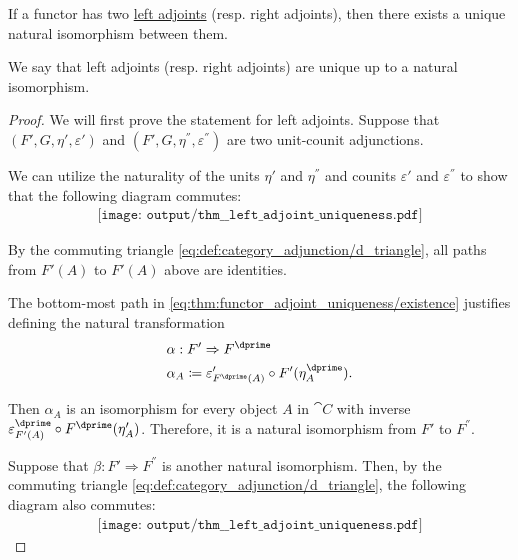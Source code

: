 \begin{proposition}\label{thm:functor_adjoint_uniqueness}
  If a functor has two \hyperref[def:category_adjunction]{left adjoints} (resp. right adjoints), then there exists a unique natural isomorphism between them.

  We say that left adjoints (resp. right adjoints) are unique up to a natural isomorphism.
\end{proposition}
\begin{proof}
  We will first prove the statement for left adjoints. Suppose that \( (F', G, \eta', \varepsilon') \) and \( (F', G, \eta^\dprime, \varepsilon^\dprime) \) are two unit-counit adjunctions.

   We can utilize the naturality of the units \( \eta' \) and \( \eta^\dprime \) and counits \( \varepsilon' \) and \( \varepsilon^\dprime \) to show that the following diagram commutes:
  \begin{equation}\label{eq:thm:functor_adjoint_uniqueness/existence}
    \begin{aligned}
      \texttt{[image: output/thm\_\_left\_adjoint\_uniqueness.pdf]}
    \end{aligned}
  \end{equation}

  By the commuting triangle \eqref{eq:def:category_adjunction/d_triangle}, all paths from \( F'(A) \) to \( F'(A) \) above are identities.

  The bottom-most path in \eqref{eq:thm:functor_adjoint_uniqueness/existence} justifies defining the natural transformation
  \begin{equation*}
    \begin{aligned}
      &\alpha: F' \Rightarrow F^\dprime \\
      &\alpha_A \coloneqq \varepsilon'_{F^\dprime(A)} \bincirc F'(\eta_A^\dprime).
    \end{aligned}
  \end{equation*}

  Then \( \alpha_A \) is an isomorphism for every object \( A \) in \( \cat{C} \) with inverse \( \varepsilon_{F'(A)}^\dprime \bincirc F^\dprime(\eta_A') \). Therefore, it is a natural isomorphism from \( F' \) to \( F^\dprime \).

   Suppose that \( \beta: F' \Rightarrow F^\dprime \) is another natural isomorphism. Then, by the commuting triangle \eqref{eq:def:category_adjunction/d_triangle}, the following diagram also commutes:
  \begin{equation}\label{eq:thm:functor_adjoint_uniqueness/uniqueness}
    \begin{aligned}
      \texttt{[image: output/thm\_\_left\_adjoint\_uniqueness.pdf]}
    \end{aligned}
  \end{equation}


\end{proof}
